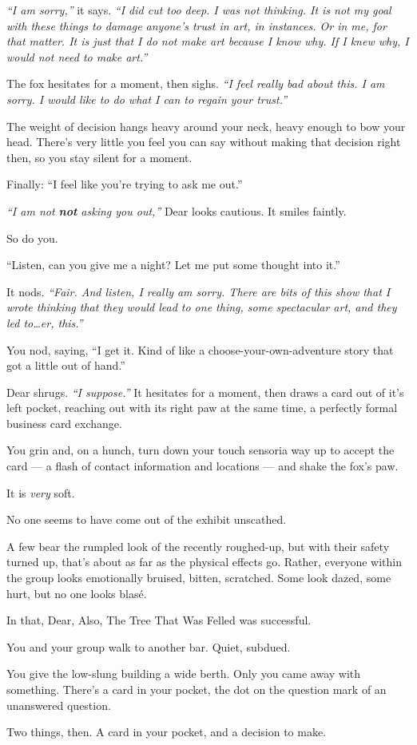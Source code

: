 \emph{``I am sorry,''} it says. \emph{``I did cut too deep. I was not thinking. It is not my goal with these things to damage anyone's trust in art, in instances. Or in me, for that matter. It is just that I do not make art because I know why. If I knew why, I would not need to make art.''}

The fox hesitates for a moment, then sighs. \emph{``I feel really bad about this. I am sorry. I would like to do what I can to regain your trust.''}

The weight of decision hangs heavy around your neck, heavy enough to bow your head. There's very little you feel you can say without making that decision right then, so you stay silent for a moment.

Finally: ``I feel like you're trying to ask me out.''

\emph{``I am not \textbf{not} asking you out,''} Dear looks cautious. It smiles faintly.

So do you.

``Listen, can you give me a night? Let me put some thought into it.''

It nods. \emph{``Fair. And listen, I really am sorry. There are bits of this show that I wrote thinking that they would lead to one thing, some spectacular art, and they led to\ldots{}er, this.''}

You nod, saying, ``I get it. Kind of like a choose-your-own-adventure story that got a little out of hand.''

Dear shrugs. \emph{``I suppose.''} It hesitates for a moment, then draws a card out of it's left pocket, reaching out with its right paw at the same time, a perfectly formal business card exchange.

You grin and, on a hunch, turn down your touch sensoria way up to accept the card --- a flash of contact information and locations --- and shake the fox's paw.

It is \emph{very} soft.


\newpage

\null
\vfill

No one seems to have come out of the exhibit unscathed.

A few bear the rumpled look of the recently roughed-up, but with their safety turned up, that's about as far as the physical effects go. Rather, everyone within the group looks emotionally bruised, bitten, scratched. Some look dazed, some hurt, but no one looks blasé.

In that, Dear, Also, The Tree That Was Felled was successful.

You and your group walk to another bar. Quiet, subdued.

You give the low-slung building a wide berth. Only you came away with something. There's a card in your pocket, the dot on the question mark of an unanswered question.

Two things, then. A card in your pocket, and a decision to make.

\vfill
